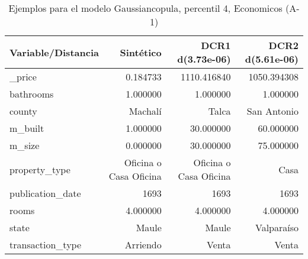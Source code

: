 \begin{table}[H]
\centering
\fontsize{10}{14}\selectfont
\caption{Ejemplos para el modelo Gaussiancopula, percentil 4, Economicos (A-1)}
\label{table-example-economicos-a-1-gaussiancopula-4p}
\begin{tabular}{|l|r|r|r|}
\hline
\rowcolor[gray]{0.8}
Variable/Distancia & Sintético & DCR1 d(3.73e-06) & DCR2 d(5.61e-06) \\
\hline \_price & \cellcolor[rgb]{0.9, 0.54, 0.52} 0.184733 & 1110.416840 & 1050.394308 \\
\hline bathrooms & \cellcolor[rgb]{0.9, 0.54, 0.52} 1.000000 & \cellcolor[rgb]{0.9, 0.54, 0.52} 1.000000 & \cellcolor[rgb]{0.9, 0.54, 0.52} 1.000000 \\
\hline county & \cellcolor[rgb]{0.9, 0.54, 0.52} Machalí & Talca & San Antonio \\
\hline m\_built & \cellcolor[rgb]{0.9, 0.54, 0.52} 1.000000 & 30.000000 & 60.000000 \\
\hline m\_size & \cellcolor[rgb]{0.9, 0.54, 0.52} 0.000000 & 30.000000 & 75.000000 \\
\hline property\_type & \cellcolor[rgb]{0.9, 0.54, 0.52} Oficina o Casa Oficina & \cellcolor[rgb]{0.9, 0.54, 0.52} Oficina o Casa Oficina & Casa \\
\hline publication\_date & \cellcolor[rgb]{0.9, 0.54, 0.52} 1693 & \cellcolor[rgb]{0.9, 0.54, 0.52} 1693 & \cellcolor[rgb]{0.9, 0.54, 0.52} 1693 \\
\hline rooms & \cellcolor[rgb]{0.9, 0.54, 0.52} 4.000000 & \cellcolor[rgb]{0.9, 0.54, 0.52} 4.000000 & \cellcolor[rgb]{0.9, 0.54, 0.52} 4.000000 \\
\hline state & \cellcolor[rgb]{0.9, 0.54, 0.52} Maule & \cellcolor[rgb]{0.9, 0.54, 0.52} Maule & Valparaíso \\
\hline transaction\_type & \cellcolor[rgb]{0.9, 0.54, 0.52} Arriendo & Venta & Venta \\
\hline
\end{tabular}
\end{table}
